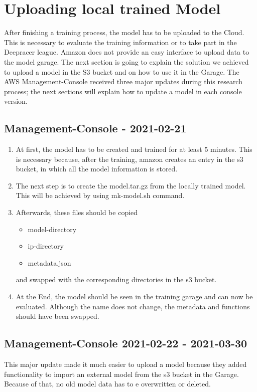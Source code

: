 \section{Uploading local trained Model}
After finishing a training process, the model has to be uploaded to the Cloud. This is necessary to evaluate the training information or to take part in the Deepracer league. Amazon does not provide an easy interface to upload data to the model garage. The next section is going to explain the solution we achieved to upload a model in the S3 bucket and on how to use it in the Garage. The AWS Management-Console received three major updates during this research process; the next sections will explain how to update a model in each console version.

\subsection{Management-Console - 2021-02-21}

\begin{enumerate}
    \item At first, the model has to be created and trained for at least 5 minutes. This is necessary because, after the training, amazon creates an entry in the s3 bucket, in which all the model information is stored.
    \item The next step is to create the model.tar.gz from the locally trained model. This will be achieved by using mk-model.sh command.
    \item Afterwards, these files should be copied 
    \begin{itemize}
        \item model-directory
        \item ip-directory
        \item metadata.json
    \end{itemize}
    and swapped with the corresponding directories in the s3 bucket.
    \item At the End, the model should be seen in the training garage and can now be evaluated. Although the name does not change, the metadata and functions should have been swapped.
\end{enumerate}


\subsection{Management-Console 2021-02-22 - 2021-03-30}
This major update made it much easier to upload a model because they added functionality to import an external model from the s3 bucket in the Garage. Because of that, no old model data has to e overwritten or deleted.

